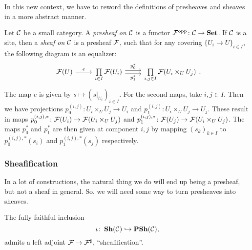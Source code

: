 \documentclass{article}
\DeclareMathOperator{\opp}{opp}
\begin{document}
In this new context, we have to reword the definitions
of presheaves and sheaves in a more abstract manner.
\begin{definition}
    Let $\mathcal{C}$ be a small category. A \emph{presheaf on $\mathcal{C}$} is
    a functor $\mcF^{\opp} \colon \mcC \to \Set$.
    If $\mathcal{C}$ is a site, then a \emph{sheaf on $\mathcal{C}$} is a
    presheaf $\mathcal{F}$, such that for any covering $\{U_i \to U\}_{i\in I}$,
    the following diagram is an equalizer:
    \begin{equation*}
        \begin{tikzcd}
            \mcF(U) \rar["e"] &\prod\limits_{i\in I}\mcF(U_i)
            \rar[shift left, "p_0^*"] \rar[shift right, "p_1^*"']
            & \prod\limits_{i,j\in I}\mcF(U_i \times_U U_j)
        \end{tikzcd}.
    \end{equation*}
    The map $e$ is given by $s \mapsto (s|_{U_i})_{i\in I}$.
    For the second maps, take $i,j\in I$. Then we have projections
    $p^{(i,j)}_0 \colon U_i \times_U U_j \to U_i$ and
    $p^{(i,j)}_1 \colon U_i \times_U U_j \to U_j$.
    These result in maps
    $p^{(i,j), *}_0 \colon \mathcal{F}(U_i) \to \mathcal{F}(U_i \times_U U_j )$ and
    $p^{(i,j), *}_1 \colon \mathcal{F}(U_j) \to \mathcal{F}(U_i \times_U U_j )$.
    The maps $p_0^*$ and $p_1^*$ are
    then given at component $i,j$ by mapping $(s_k)_{k\in I}$ to
    $p^{(i,j), *}_0(s_i)$ and $p^{(i,j), *}_1(s_j)$ respectively.
\end{definition}

\subsubsection{Sheafification}
In a lot of constructions, the natural thing we do will end up
being a presheaf, but not a sheaf in general. So, we will need some way to turn
presheaves into sheaves.
\begin{prop}
    \label{prop:sheafification}
    The fully faithful inclusion
    \begin{equation*}
        \iota \colon \operatorname{\mathbf{Sh}}(\mathcal{C}) \hookrightarrow \operatorname{\mathbf{PSh}}(\mathcal{C}),
    \end{equation*}
    admits a left adjoint $\mathcal{F} \to \mathcal{F}^\sharp$, ``sheafification''.
\end{prop}
\end{document}
